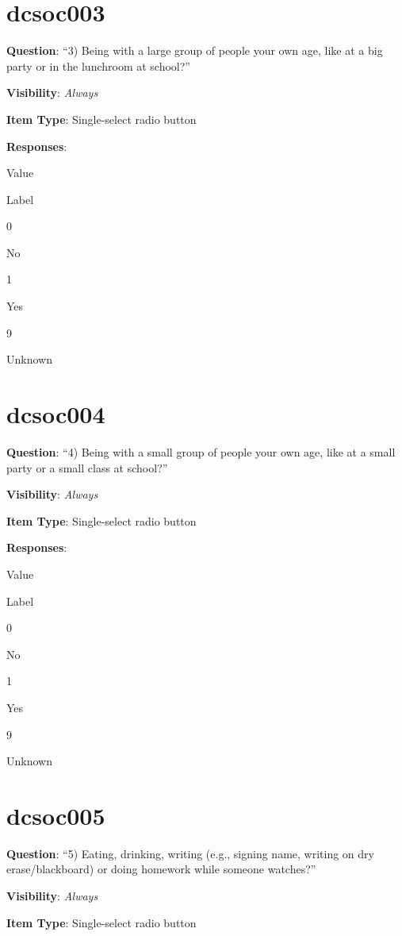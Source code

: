 \documentclass[]{book}
\begin{document}
\hypertarget{dcsoc003}{%
\section{dcsoc003}\label{dcsoc003}}

\textbf{Question}: ``3) Being with a large group of people your own age, like at a big party or in the lunchroom at school?''

\textbf{Visibility}: \emph{Always}

\textbf{Item Type}: Single-select radio button

\textbf{Responses}:

Value

Label

0

No

1

Yes

9

Unknown

\hypertarget{dcsoc004}{%
\section{dcsoc004}\label{dcsoc004}}

\textbf{Question}: ``4) Being with a small group of people your own age, like at a small party or a small class at school?''

\textbf{Visibility}: \emph{Always}

\textbf{Item Type}: Single-select radio button

\textbf{Responses}:

Value

Label

0

No

1

Yes

9

Unknown

\hypertarget{dcsoc005}{%
\section{dcsoc005}\label{dcsoc005}}

\textbf{Question}: ``5) Eating, drinking, writing (e.g., signing name, writing on dry erase/blackboard) or doing homework while someone watches?''

\textbf{Visibility}: \emph{Always}

\textbf{Item Type}: Single-select radio button
\end{document}
